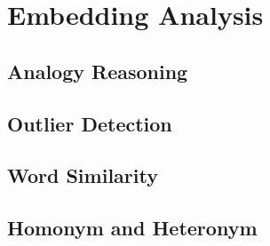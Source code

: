 \section{Embedding Analysis} \label{sec:embedding_analysis}
\subsection{Analogy Reasoning} \label{sec:analogy}
\subsection{Outlier Detection} \label{sec:outlier}
\subsection{Word Similarity} \label{sec:similarity}
\subsection{Homonym and Heteronym} \label{sec:homonym_heteronym}